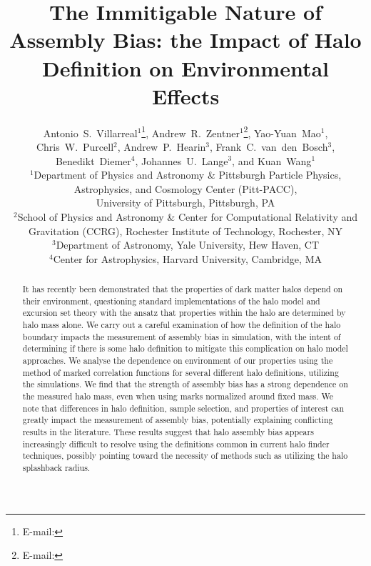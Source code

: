 \documentclass[usenatbib,fleqn]{mnras}
\title[The Immitigable Nature of Assembly Bias]{The Immitigable Nature of Assembly
Bias: the Impact of Halo Definition on Environmental Effects}
\author[A.~S.~Villarreal et al.]{%
Antonio~S.~Villarreal$^{1}$\thanks{E-mail: \email{asv13@pitt.edu}},
Andrew~R.~Zentner$^{1}$\thanks{E-mail: \email{zentner@pitt.edu}},
Yao-Yuan~Mao$^{1}$, %
Chris~W.~Purcell$^{2}$,%
\newauthor
Andrew~P.~Hearin$^{3}$, %
Frank~C.~van~den~Bosch$^{3}$, %
Benedikt~Diemer$^{4}$, %
Johannes~U.~Lange$^{3}$,
\newauthor
and Kuan~Wang$^{1}$
\\
$^{1}$Department of Physics and Astronomy \& Pittsburgh Particle Physics, Astrophysics, and Cosmology Center (Pitt-PACC), \\
\phantom{$^{1}$}University of Pittsburgh, Pittsburgh, PA\\
$^{2}$School of Physics and Astronomy \& Center for Computational Relativity and Gravitation (CCRG), Rochester Institute of Technology, Rochester, NY \\
$^{3}$Department of Astronomy, Yale University, Hew Haven, CT\\
$^{4}$Center for Astrophysics, Harvard University, Cambridge, MA}
\begin{document}
\label{firstpage}
\pagerange{\pageref{firstpage}--\pageref{lastpage}} 

\maketitle

\begin{abstract}


It has recently been demonstrated that the properties of dark matter halos depend on their environment, questioning standard
implementations of the halo model and excursion set theory with the ansatz that properties within the halo are determined by halo mass alone. We carry out a careful examination of how the
definition of the halo boundary impacts the measurement of assembly bias in simulation, with the intent of determining if there is some halo definition to mitigate this complication on
halo model approaches. We analyse the dependence on environment of our properties using the method of marked correlation functions for several different halo definitions, utilizing the
\citet{diemer_kravtsov15} simulations. We find that the strength of assembly bias has a strong dependence on the measured halo mass, even when using marks normalized around fixed mass. We note that differences in halo definition, sample selection, and
properties of interest can greatly impact
the measurement of assembly bias, potentially explaining conflicting results in the literature. These results suggest that
halo assembly bias appears increasingly difficult to resolve using the definitions common in current halo finder techniques,
possibly pointing toward the necessity of methods such as utilizing the halo splashback radius.

\end{abstract}
\end{document}
